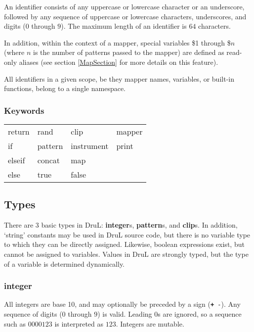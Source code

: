 An identifier consists of any uppercase or lowercase character
or an underscore, followed by any sequence of uppercase or lowercase characters,
underscores, and digits ($0$ through $9$). The maximum length of an identifier
is $64$ characters.

In addition, within the context of a mapper, special variables \$1 through \$$n$ (where $n$ is the number of patterns passed to the mapper) are defined as read-only aliases (see section \ref{MapSection} for more details on this feature).

All identifiers in a given scope, be they mapper names, variables, or built-in functions, belong to a single namespace.

\subsubsection{Keywords}

\begin{table}[htb]
\begin{center}
\begin{tabular}{llll}
  return & rand    & clip       & mapper \\
  if     & pattern & instrument & print  \\
  elseif & concat  & map        &    \\
  else   & true    & false      &
\end{tabular}
\label{tab:keywords}
\end{center}
\end{table}



\subsection{Types}

There are $3$ basic types in DruL: \textbf{integer}s, \textbf{pattern}s,
and \textbf{clip}s.  In addition, `string' constants may be used in DruL source code, but there is no variable type to which they can be directly assigned.
Likewise, boolean expressions exist, but cannot be assigned to variables.
Values in DruL are strongly typed, but the type of a variable is determined dynamically.

\subsubsection{integer}

All integers are base 10, and may optionally be preceded by a sign ({\tt \textbf + -}).
Any sequence of digits ($0$ through $9$) is valid.  Leading $0$s are ignored, so a sequence such as $0000123$  is interpreted as $123$.  Integers are mutable.

